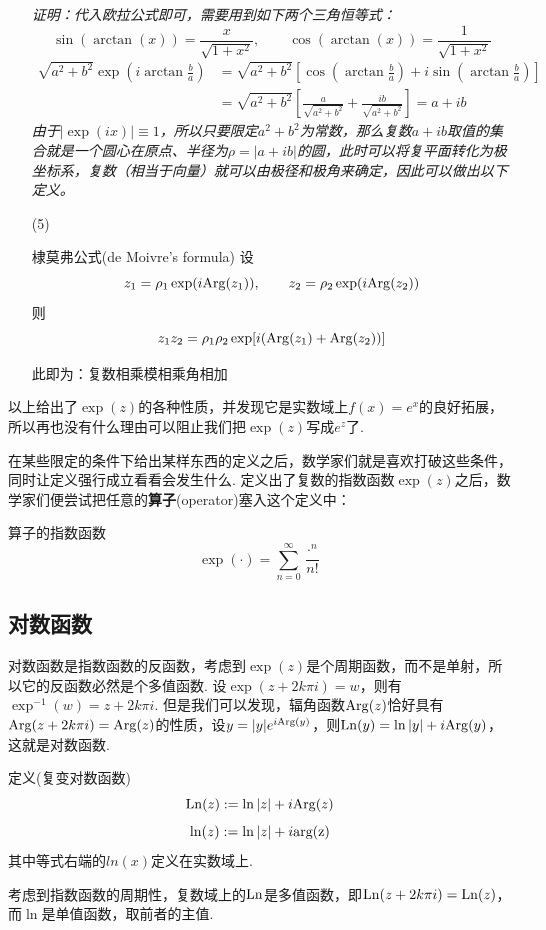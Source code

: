\begin{itemize}
    \textit{
        证明：代入欧拉公式即可，需要用到如下两个三角恒等式：
        \[\sin(\arctan(x))=\frac{x}{\sqrt{1+x^2}},\qquad \cos(\arctan(x))=\frac{1}{\sqrt{1+x^2}}\]
    }
    \begin{align*}
        \sqrt{a^2+b^2}\exp\left(i\arctan\frac{b}{a}\right) &= 
        \sqrt{a^2+b^2}\left[\cos\left(\arctan\frac{b}{a}\right)+i\sin\left(\arctan\frac{b}{a}\right)\right] \\
        &=\sqrt{a^2+b^2}\left[\frac{a}{\sqrt{a^2+b^2}}+\frac{ib}{\sqrt{a^2+b^2}}\right] = a+ib
    \end{align*}
    \textit{
        由于\(|\exp(ix)|\equiv 1\)，所以只要限定\(a^2+b^2\)为常数，那么复数\(a+ib\)取值的集合就是一个圆心在原点、半径为\(\rho=|a+ib|\)的圆，此时可以将复平面转化为极坐标系，复数（相当于向量）就可以由极径和极角来确定，因此可以做出以下定义。
    }
    \item[(5)]
    \begin{theorem}{棣莫弗公式(de Moivre's formula)}
        设
        \[z_1=\rho_1\exp(i{\rm Arg}(z_1)), \qquad z_2=\rho_2\exp(i{\rm Arg}(z_2))\]
        则
        \[z_1z_2=\rho_1\rho_2\exp[i({\rm Arg}(z_1)+{\rm Arg}(z_2))]\]
    \end{theorem}
    此即为：复数相乘模相乘角相加
\end{itemize}

以上给出了\(\exp(z)\)的各种性质，并发现它是实数域上\(f(x)=e^x\)的良好拓展，所以再也没有什么理由可以阻止我们把\(\exp(z)\)写成\(e^z\)了.

\vspace{1cm}

在某些限定的条件下给出某样东西的定义之后，数学家们就是喜欢打破这些条件，同时让定义强行成立看看会发生什么. 定义出了复数的指数函数\(\exp(z)\)之后，数学家们便尝试把任意的\textbf{算子}(operator)塞入这个定义中：
\begin{definition}{算子的指数函数}
    \[\exp(\cdot) = \sum_{n=0}^{\infty}\frac{\cdot^n}{n!}\]
\end{definition}

\subsection{对数函数}

对数函数是指数函数的反函数，考虑到\(\exp(z)\)是个周期函数，而不是单射，所以它的反函数必然是个多值函数. 设\(\exp(z+2k\pi i)=w\)，则有\(\exp^{-1}(w)=z+2k\pi i\). 但是我们可以发现，辐角函数\({\rm Arg}(z)\)恰好具有\({\rm Arg}(z+2k\pi i)={\rm Arg}(z)\)的性质，设\(y=|y|e^{i{\rm Arg}(y)}\)，则\({\rm Ln}(y)=\ln|y|+i{\rm Arg}(y)\)，这就是对数函数.
\begin{definition}{定义(复变对数函数)}
    \[{\rm Ln}(z):=\ln|z|+i{\rm Arg}(z)\]
    \[\ln(z):=\ln|z|+i{\rm arg(z)}\]
    其中等式右端的\(ln(x)\)定义在实数域上.
\end{definition}
考虑到指数函数的周期性，复数域上的\({\rm Ln}\)是多值函数，即\({\rm Ln}(z+2k\pi i)={\rm Ln}(z)\)，而\(\ln\)是单值函数，取前者的主值.

